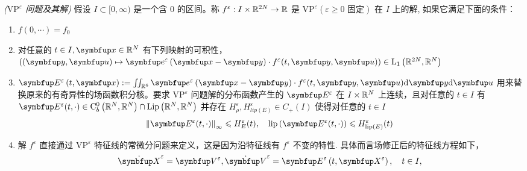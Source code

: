 \begin{definition}\textit{($\text{VP}^\varepsilon$ 问题及其解)}
    假设 $I \subset[0, \infty)$ 是一个含 $0$ 的区间。称 $f^{\varepsilon}: I \times {\mathbb{R}}^{2 N} \rightarrow {\mathbb{R}}$ 是 $\text{VP}^{\varepsilon}(\varepsilon \geqslant 0 \text { 固定})$ 在 $I$ 上的解, 如果它满足下面的条件：

    \begin{enumerate}[(1)] 
        \item $f(0,\cdots) = f_0$
        \item 对任意的 $t \in I, \vx \in \bbR^{N}$ 有下列映射的可积性， \\ $\left((\vect{y},\vect{u}) \mapsto \vect{e}^{\varepsilon}\left(\vx-\vect{y}\right) \cdot f^{\varepsilon}(t, \vect{y},\vect{u})\right) \in \mathrm{L}_{1}\left(\bbR^{2 N}, \bbR^{N}\right)$ 
        \item $\vE^{\varepsilon}\left(t, \vx\right):=\iint_{\bbR^6}  \vect{e}^{\varepsilon}\left(\vx-\vect{y}\right) \cdot f^{\varepsilon}(t, \vect{y},\vect{u}) \mathrm{d} \vect{y} \mathrm{d}\vect{u}$ 用来替换原来的有奇异性的场函数积分核。要求 $\text{VP}^\varepsilon$ 问题解的分布函数产生的 $\vE^{\varepsilon}$ 在 $I \times {\mathbb{R}}^{N}$ 上连续，且对任意的 $t \in I$ 有 $\vE^{\varepsilon}(t, \cdot) \in \mathrm{C}_{b}^{0}\left(\bbR^{N}, \bbR^{N}\right) \cap \operatorname{Lip}\left(\bbR^{N}, \bbR^{N}\right)$ 并存在
        $H_\rho^{\varepsilon}, H_{lip(E)}^{\varepsilon} \in C_{+}(I)$ 使得对任意的 $t \in I$
        \[
        \left\|\vE^{\varepsilon}(t, \cdot)\right\|_{\infty} \leqslant H_{ E}^{\varepsilon}(t), \quad 
        \operatorname{lip}\left(\vE^{\varepsilon}(t, \cdot)\right) \leqslant H_{\operatorname{lip}(E)}^{\varepsilon}(t)
        \]
        \item 
        解 $f^{\varepsilon}$ 直接通过 $\text{VP}^\varepsilon$ 特征线的常微分问题来定义，这是因为沿特征线有 $f^\varepsilon$ 不变的特性. 具体而言场修正后的特征线方程如下， 
        \begin{equation}
            \dot{\vect{X}}^\varepsilon=\vect{V}^\varepsilon, \dot{\vect{V}}^\varepsilon=\vE^{\varepsilon}\left(t, \vect{X}^\varepsilon\right), \quad t \in I,
        \end{equation}
        

\end{enumerate}
\end{definition}
